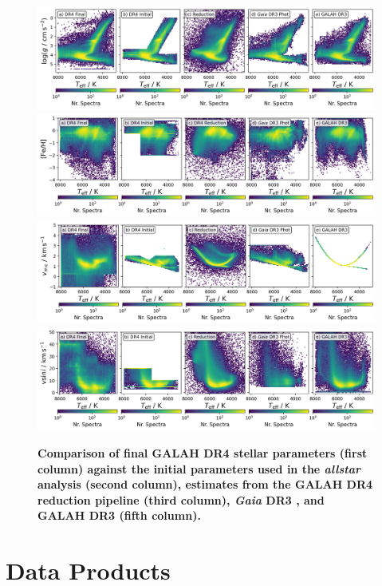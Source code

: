 \documentclass[
  journal=pasa,
  manuscript=research-paper, %
  year=2024,
  volume=37
]{cup-journal}
\newcommand{\vmic}{$v_\mathrm{mic}$\xspace}
\newcommand{\Gaia}{\textit{Gaia}\xspace}
\begin{document}
\begin{figure}[ht]
 \centering
 \includegraphics[width=\textwidth]{figures/initial_teff_logg.png}
 \includegraphics[width=\textwidth]{figures/initial_teff_fe_h.png}
 \includegraphics[width=\textwidth]{figures/initial_teff_vmic.png}
 \includegraphics[width=\textwidth]{figures/initial_teff_vsini.png} \caption{\textbf{Comparison of final GALAH DR4 stellar parameters (first column) against the initial parameters used in the \textit{allstar} analysis (second column), estimates from the GALAH DR4 reduction pipeline (third column), \Gaia DR3 \citep[fourth column with \vmic based on the adjusted formula from ][]{DutraFerreira2016}, and GALAH DR3 (fifth column).}} \label{fig:initial_parameters}
\end{figure}

\section{Data Products}
\end{document}
